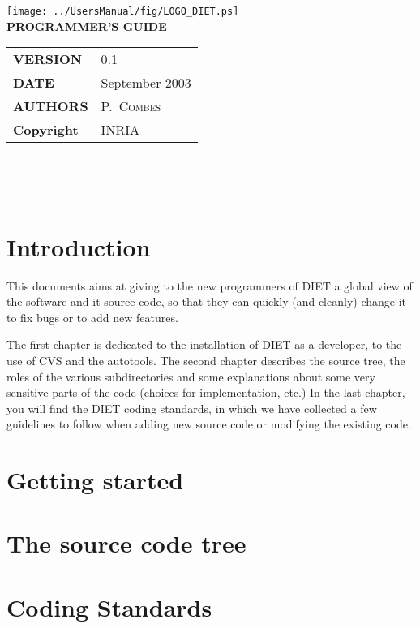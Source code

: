 \documentclass[11pt,a4paper]{report}
\begin{document}

\thispagestyle{empty}
\vspace*{3cm}
\vspace*{3cm}

\begin{center}
\texttt{[image: ../UsersManual/fig/LOGO\_DIET.ps]}\\[2ex]
\textbf{\Huge PROGRAMMER'S GUIDE\\[2ex]}
\end{center}

\vfill

\noindent
\small{
\begin{tabular}{ll}
  \textbf{VERSION}  & 0.1\\
  \textbf{DATE}     & September 2003\\
  \textbf{AUTHORS}  & P.~\textsc{Combes}\\
  \textbf{Copyright}& INRIA
\end{tabular}\\
}

\newpage
\thispagestyle{empty}
\ 



\newpage
\tableofcontents


\sloppy

%
%
\newpage
{}
\chapter*{Introduction}

This documents aims at giving to the new programmers of DIET a global view of the
software and it source code, so that they can quickly (and cleanly) change it to
fix bugs or to add new features.

The first chapter is dedicated to the installation of DIET as a developer, to
the use of CVS and the autotools.
The second chapter describes the source tree, the roles of the various
subdirectories and some explanations about some very sensitive parts of the code
(choices for implementation, etc.)
In the last chapter, you will find the DIET coding standards, in which we have
collected a few guidelines to follow when adding new source code or modifying
the existing code.


%
%
\chapter{Getting started}
\label{ch:start}



%
%
\chapter{The source code tree}
\label{ch:tree}



%
%
\chapter{Coding Standards}
\label{ch:CS}

\end{document}
